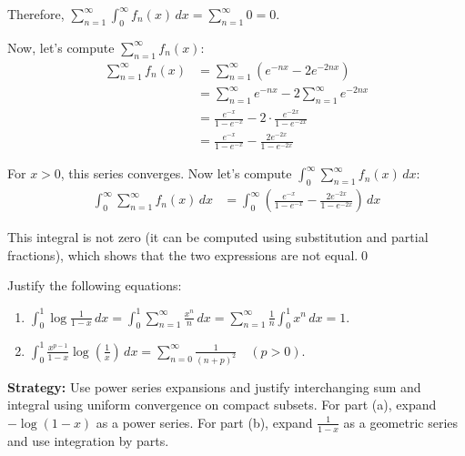 Therefore, $\sum_{n=1}^{\infty} \int_{0}^{\infty} f_n(x) \, dx = \sum_{n=1}^{\infty} 0 = 0$.

Now, let's compute $\sum_{n=1}^{\infty} f_n(x)$:
\begin{align*}
\sum_{n=1}^{\infty} f_n(x) &= \sum_{n=1}^{\infty} (e^{-nx} - 2e^{-2nx}) \\
&= \sum_{n=1}^{\infty} e^{-nx} - 2\sum_{n=1}^{\infty} e^{-2nx} \\
&= \frac{e^{-x}}{1 - e^{-x}} - 2 \cdot \frac{e^{-2x}}{1 - e^{-2x}} \\
&= \frac{e^{-x}}{1 - e^{-x}} - \frac{2e^{-2x}}{1 - e^{-2x}}
\end{align*}

For $x > 0$, this series converges. Now let's compute $\int_{0}^{\infty} \sum_{n=1}^{\infty} f_n(x) \, dx$:
\begin{align*}
\int_{0}^{\infty} \sum_{n=1}^{\infty} f_n(x) \, dx &= \int_{0}^{\infty} \left(\frac{e^{-x}}{1 - e^{-x}} - \frac{2e^{-2x}}{1 - e^{-2x}}\right) \, dx
\end{align*}

This integral is not zero (it can be computed using substitution and partial fractions), which shows that the two expressions are not equal.\qed


\begin{problembox}
\begin{problemstatement}
Justify the following equations:
\begin{enumerate}[label=(\alph*)]
\item $\int_{0}^{1} \log \frac{1}{1-x} \, dx = \int_{0}^{1} \sum_{n=1}^{\infty} \frac{x^n}{n} \, dx = \sum_{n=1}^{\infty} \frac{1}{n} \int_{0}^{1} x^n \, dx = 1.$
\item $\int_{0}^{1} \frac{x^{p-1}}{1-x} \log \left( \frac{1}{x} \right) \, dx = \sum_{n=0}^{\infty} \frac{1}{(n+p)^2} \quad (p > 0).$
\end{enumerate}
\end{problemstatement}
\end{problembox}

\noindent\textbf{Strategy:} Use power series expansions and justify interchanging sum and integral using uniform convergence on compact subsets. For part (a), expand $-\log(1-x)$ as a power series. For part (b), expand $\frac{1}{1-x}$ as a geometric series and use integration by parts.

